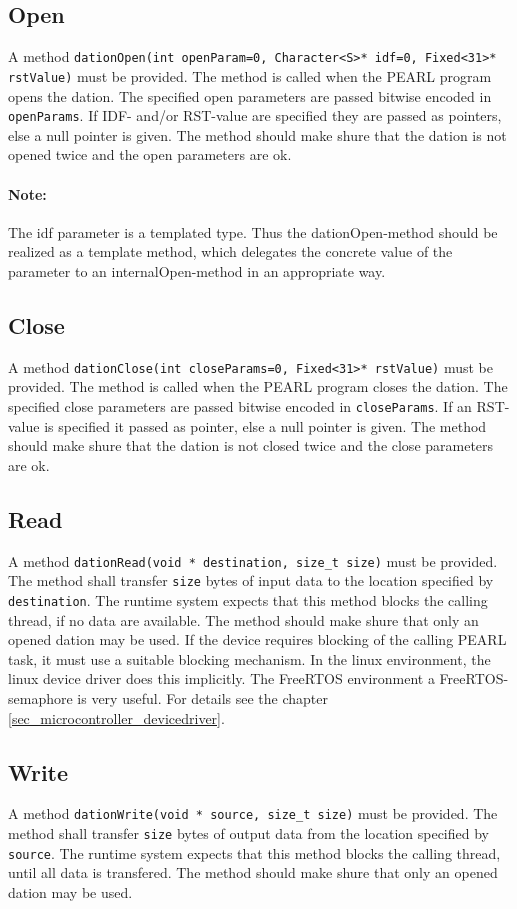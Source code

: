 \subsection{Open}
A method \verb|dationOpen(int openParam=0, Character<S>* idf=0, Fixed<31>* rstValue)|
must be provided.
The method is called when the PEARL program opens the dation.
The specified open parameters are passed bitwise encoded in \verb|openParams|.
If IDF- and/or RST-value are specified they are passed as pointers, else
a null pointer is given.
The method should make shure that the dation is not opened twice and
the open parameters are ok.

\paragraph{Note:} The idf parameter is a templated type.
 Thus the dationOpen-method should be realized as a template method,
 which delegates the concrete value of the parameter to an
 internalOpen-method in an appropriate way.

\subsection{Close}
A method \verb|dationClose(int closeParams=0, Fixed<31>* rstValue)|
must be provided.
The method is called when the PEARL program closes the dation.
The specified close parameters are passed bitwise encoded in \verb|closeParams|.
If an RST-value is specified it passed as pointer, else
a null pointer is given.
The method should make shure that the dation is not closed twice and
the close parameters are ok.

\subsection{Read}
A method \verb|dationRead(void * destination, size_t size)|
must be provided. The method shall transfer \verb|size| bytes of
input data to the location specified by \verb|destination|.
The runtime system expects that this method blocks the calling thread,
if no data are available.
The method should make shure that only an opened dation may be used.
If the device requires blocking of the calling PEARL task, it 
must use a suitable blocking mechanism. In the linux environment,
the linux device driver does this implicitly. 
The FreeRTOS environment a FreeRTOS-semaphore is very useful. For details
see the chapter \ref{sec_microcontroller_devicedriver}.


\subsection{Write}
A method \verb|dationWrite(void * source, size_t size)|
must be provided. The method shall transfer \verb|size| bytes of
output data from the location specified by \verb|source|.
The runtime system expects that this method blocks the calling thread,
until all data is transfered.
The method should make shure that only an opened dation may be used.

